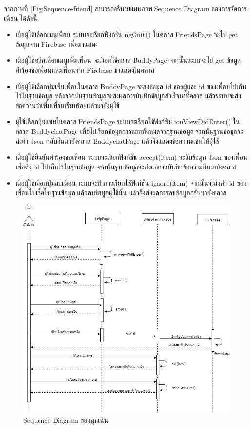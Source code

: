 จากภาพที่ \ref{Fig:Sequence-friend} สามารถอธิบายแผนภาพ Sequence Diagram ของการจัดการเพื่อน ได้ดังนี้ 
\begin{itemize}
	\item เมื่อผู้ใช้เลือกเมนูเพื่อน ระบบจะเรียกฟังก์ชัน ngOnit() ในคลาส FriendsPage จะไป get ข้อมูลจาก Firebase เพื่อมาแสดง
	\item เมื่อผู้ใช้คลิกเลือกเมนูเพิ่มเพื่อน จะเรียกใช้คลาส BuddyPage จากนั้นระบบจะไป get ข้อมูลคำร้องขอเพื่อนและเพื่อนจาก Firebase มาแสดงในคลาส 
	\item เมื่อผู้ใช้เลือกปุ่มเพิ่มเพื่อนในคลาส BuddyPage จะส่งข้อมูล id ของผู้และ id ของเพื่อนไปเก็บไว้ในฐานข้อมูล หลังจากนั้นฐานข้อมูลจะส่งผลการบันทึกข้อมูลสำเร็จมาที่คลาส แล้วระบบจะส่งข้อความว่าเพิ่มเพื่อนเรียบร้อยแล้วมายังผู้ใช้
	\item ผู้ใช้เลือกปุ่มแชทในคลาส FriendsPage ระบบจะเรียกใช้ฟังก์ชัน ionViewDidEnter() ในคลาส BuddychatPage เพื่อไปเรียกข้อมูลการแชททั้งหมดจากฐานข้อมูล จากนั้นฐานข้อมูลจะส่งค่า Json กลับคืนมายังคลาส BuddychatPage แล้วจึงแสดงข้อความแชทให้ผู้ใช้
	\item เมื่อผู้ใช้ยืนยันคำร้องขอเพื่อน ระบบจะเรียกฟังก์ชัน accept(item) จะรับข้อมูล Json ของเพื่อนเพื่อดึง id ไปเก็บไว้ในฐานข้อมูล จากนั้นฐานข้อมูลจะส่งผลการบันทึกข้อความคืนมายังคลาส
	\item เมื่อผู้ใช้เลือกปุ่มลบเพื่อน ระบบจะทำการเรียกใช้ฟังก์ชัน ignore(item) จากนั้นจะส่งค่า id ของเพื่อนไปเช็คในฐานข้อมูล แล้วลบข้อมูลผู้ใช้นั้น แล้วจึงส่งผลการลบข้อมูลกลับมายังคลาส
	\end{itemize}

 
\begin{figure}[H]
	\centering
	\includegraphics[width=1.1\columnwidth]
	{Figures/3/Sequence/danger}
	\caption{Sequence Diagram ของฉุกเฉิน}
	\label{Fig:Sequence-danger}
\end{figure}
\newpage

